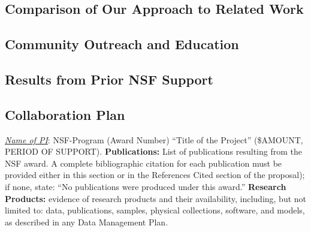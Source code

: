 \subsection{Comparison of Our Approach to Related Work}

\subsection{Community Outreach and Education}

\subsection{Results from Prior NSF Support}

\subsection{Collaboration Plan}

\noindent
\emph{\underline{Name of PI}}: NSF-Program (Award Number) ``Title of the Project'' (\$AMOUNT, PERIOD OF SUPPORT).
{\bf Publications:} List of publications resulting from the NSF award. A complete bibliographic citation for each
publication must be provided either in this section or in the References Cited section of the proposal); if
none, state: ``No publications were produced under this award.'' {\bf Research Products:} evidence of research products
and their availability, including, but not limited to: data, publications, samples, physical collections, software,
and models, as described in any Data Management Plan.
